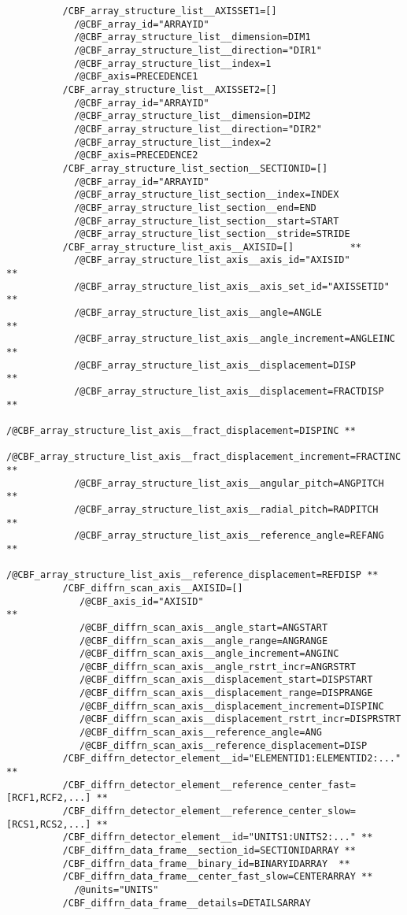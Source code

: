 \documentclass[11pt]{article}
\begin{document}
{\begin{verbatim}
          /CBF_array_structure_list__AXISSET1=[]
            /@CBF_array_id="ARRAYID"
            /@CBF_array_structure_list__dimension=DIM1
            /@CBF_array_structure_list__direction="DIR1"
            /@CBF_array_structure_list__index=1
            /@CBF_axis=PRECEDENCE1
          /CBF_array_structure_list__AXISSET2=[]
            /@CBF_array_id="ARRAYID"
            /@CBF_array_structure_list__dimension=DIM2
            /@CBF_array_structure_list__direction="DIR2"
            /@CBF_array_structure_list__index=2
            /@CBF_axis=PRECEDENCE2
          /CBF_array_structure_list_section__SECTIONID=[]
            /@CBF_array_id="ARRAYID"
            /@CBF_array_structure_list_section__index=INDEX
            /@CBF_array_structure_list_section__end=END
            /@CBF_array_structure_list_section__start=START
            /@CBF_array_structure_list_section__stride=STRIDE
          /CBF_array_structure_list_axis__AXISID=[]          **
            /@CBF_array_structure_list_axis__axis_id="AXISID"          **
            /@CBF_array_structure_list_axis__axis_set_id="AXISSETID"   **
            /@CBF_array_structure_list_axis__angle=ANGLE               **
            /@CBF_array_structure_list_axis__angle_increment=ANGLEINC  **
            /@CBF_array_structure_list_axis__displacement=DISP         **
            /@CBF_array_structure_list_axis__displacement=FRACTDISP    **
            /@CBF_array_structure_list_axis__fract_displacement=DISPINC **
            /@CBF_array_structure_list_axis__fract_displacement_increment=FRACTINC **
            /@CBF_array_structure_list_axis__angular_pitch=ANGPITCH    **
            /@CBF_array_structure_list_axis__radial_pitch=RADPITCH     **
            /@CBF_array_structure_list_axis__reference_angle=REFANG    **
            /@CBF_array_structure_list_axis__reference_displacement=REFDISP **
          /CBF_diffrn_scan_axis__AXISID=[]   
             /@CBF_axis_id="AXISID"                                       **
             /@CBF_diffrn_scan_axis__angle_start=ANGSTART
             /@CBF_diffrn_scan_axis__angle_range=ANGRANGE
             /@CBF_diffrn_scan_axis__angle_increment=ANGINC
             /@CBF_diffrn_scan_axis__angle_rstrt_incr=ANGRSTRT
             /@CBF_diffrn_scan_axis__displacement_start=DISPSTART
             /@CBF_diffrn_scan_axis__displacement_range=DISPRANGE
             /@CBF_diffrn_scan_axis__displacement_increment=DISPINC
             /@CBF_diffrn_scan_axis__displacement_rstrt_incr=DISPRSTRT
             /@CBF_diffrn_scan_axis__reference_angle=ANG
             /@CBF_diffrn_scan_axis__reference_displacement=DISP
          /CBF_diffrn_detector_element__id="ELEMENTID1:ELEMENTID2:..."      **
          /CBF_diffrn_detector_element__reference_center_fast=[RCF1,RCF2,...] **
          /CBF_diffrn_detector_element__reference_center_slow=[RCS1,RCS2,...] **
          /CBF_diffrn_detector_element__id="UNITS1:UNITS2:..." **
          /CBF_diffrn_data_frame__section_id=SECTIONIDARRAY **
          /CBF_diffrn_data_frame__binary_id=BINARYIDARRAY  **
          /CBF_diffrn_data_frame__center_fast_slow=CENTERARRAY **
            /@units="UNITS"
          /CBF_diffrn_data_frame__details=DETAILSARRAY
        

\end{verbatim}}
\end{document}
